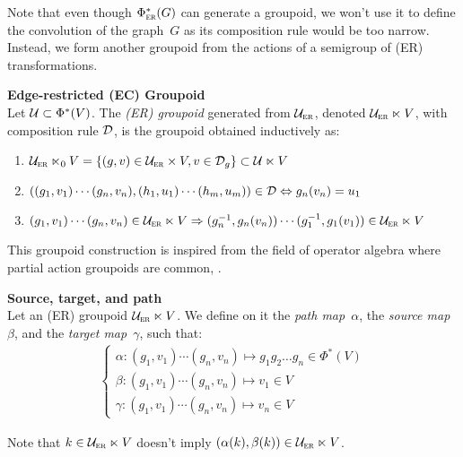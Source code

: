 Note that even though $\Phi_{\operatorname{\textsc{er}}}^*(G)$ can generate a groupoid, we won't use it to define the convolution of the graph~$G$ as its composition rule would be too narrow. Instead, we form another groupoid from the actions of a semigroup of (ER) transformations.

\begin{definition}\textbf{Edge-restricted (EC) Groupoid}\\
Let $\mathcal{U} \subset \Phi^*(V)$. The \emph{(ER) groupoid} generated from $\mathcal{U}_{\operatorname{\textsc{er}}}$, denoted $\mathcal{U}_{\operatorname{\textsc{er}}} \ltimes V$, with composition rule $\mathcal{D}$, is the groupoid obtained inductively as:
\begin{enumerate}
  \item $\mathcal{U}_{\operatorname{\textsc{er}}} \ltimes_0 V = \{(g,v) \in \mathcal{U}_{\operatorname{\textsc{er}}} \times V, v \in \mathcal{D}_g \} \subset \mathcal{U} \ltimes V$
  \item $((g_1,v_1) \cdots (g_n,v_n) , (h_1,u_1) \cdots (h_m,u_m)) \in \mathcal{D} \Leftrightarrow g_n(v_n) = u_1$
  \item $(g_1,v_1) \cdots (g_n,v_n) \in \mathcal{U}_{\operatorname{\textsc{er}}} \ltimes V \Rightarrow (g_n^{-1}, g_n(v_n)) \cdots (g_1^{-1}, g_1(v_1)) \in \mathcal{U}_{\operatorname{\textsc{er}}} \ltimes V$
\end{enumerate}
\end{definition}

\begin{remark}
This groupoid construction is inspired from the field of operator algebra where partial action groupoids are common, \eg \cite{nica1994groupoid,exel1998partial,li2016partial}.
\end{remark}

\begin{definition}\textbf{Source, target, and path}\\
Let an (ER) groupoid $\mathcal{U}_{\operatorname{\textsc{er}}} \ltimes V$. We define on it the \emph{path map}~$\alpha$, the \emph{source map}~$\beta$, and the \emph{target map}~$\gamma$, such that:
\begin{gather*}
\begin{cases}
  \alpha: (g_1,v_1) \cdots (g_n,v_n) \mapsto g_1g_2\ldots g_n \in \Phi^*(V)\\
  \beta: (g_1,v_1) \cdots (g_n,v_n) \mapsto v_1 \in V\\
  \gamma: (g_1,v_1) \cdots (g_n,v_n) \mapsto v_n \in V
\end{cases}
\end{gather*}
\end{definition}

\begin{remark}Note that $k \in \mathcal{U}_{\operatorname{\textsc{er}}} \ltimes V$ doesn't imply $(\alpha(k), \beta(k)) \in \mathcal{U}_{\operatorname{\textsc{er}}} \ltimes V$.
\end{remark}

